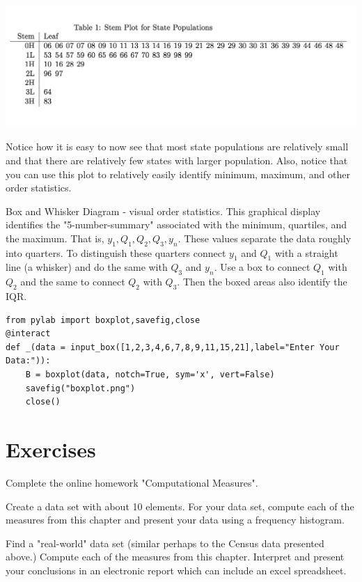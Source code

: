 \documentclass[10pt,]{book}
\theoremstyle{plain}
\theoremstyle{definition}
\theoremstyle{definition}
\numberwithin{equation}{section}
\begin{document}
		
\includegraphics[width=1\linewidth]{images/stemandleaf.png}


Notice how it is easy to now see that most state populations are relatively small and that there are relatively few states with larger population. Also, notice that you can use this plot to relatively easily identify minimum, maximum, and other order statistics.		
		
\par
Box and Whisker Diagram - visual order statistics. This graphical display identifies the "5-number-summary" associated with the minimum, quartiles, and the maximum. That is, \(y_1, Q_1, Q_2, Q_3, y_n\).  These values separate the data roughly into quarters. To distinguish these quarters connect \(y_1\) and \(Q_1\) with a straight line (a whisker) and do the same with \(Q_3\) and \(y_n\). Use a box to connect \(Q_1\) with \(Q_2\) and the same to connect \(Q_2\) with \(Q_3\). Then the boxed areas also identify the IQR.    
\begin{lstlisting}[style=sageinput]
from pylab import boxplot,savefig,close
@interact
def _(data = input_box([1,2,3,4,6,7,8,9,11,15,21],label="Enter Your Data:")):
    B = boxplot(data, notch=True, sym='x', vert=False)
    savefig("boxplot.png")
    close()
\end{lstlisting}

\typeout{************************************************}
\typeout{************************************************}
\section[Exercises]{Exercises}\label{section-12}
Complete the online homework "Computational Measures".%
\par
Create a data set with about 10 elements. For your data set, compute each of the measures from this chapter and present your data using a frequency histogram.%
\par
Find a "real-world" data set (similar perhaps to the Census data presented above.) Compute each of the measures from this chapter. Interpret and present your conclusions in an electronic report which can include an excel spreadsheet.%
\typeout{************************************************}
\typeout{************************************************}
\end{document}
